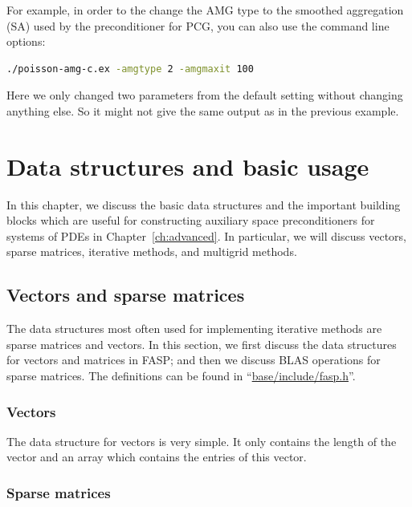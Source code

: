 \documentclass[11pt]{memoir}
\begin{document}
For example, in order to the change the AMG type to the smoothed aggregation (SA) used by the preconditioner for PCG, you can also use the command line options:
%
\begin{lstlisting}[numbers=none,language=sh]
./poisson-amg-c.ex -amgtype 2 -amgmaxit 100
\end{lstlisting}
%
Here we only changed two parameters from the default setting without changing anything else. So it might not give the same output as in the previous example. 

\chapter{Data structures and basic usage}\label{ch:basic}

In this chapter, we discuss the basic data structures and the
important building blocks which are useful for constructing auxiliary
space preconditioners for systems of PDEs in
Chapter~\ref{ch:advanced}. In particular, we will discuss vectors,
sparse matrices, iterative methods, and multigrid methods.

\section{Vectors and sparse matrices}\label{sec:blas}

The data structures most often used for implementing iterative methods are
sparse matrices and vectors. In this section, we first discuss the
data structures for vectors and matrices in FASP; and then we discuss
BLAS operations for sparse matrices. The definitions can be found in
``\url{base/include/fasp.h}''.

\subsection{Vectors}

The data structure for vectors is very simple. It only contains the length of the vector and an array which contains the entries of this vector.
%

%

\subsection{Sparse matrices}
\end{document}
